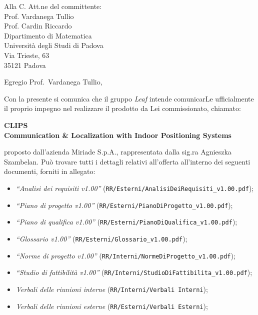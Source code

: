 \documentclass[a4paper,12pt]{letteracdp}
\author{Federico Tavella}
\date{21 gennaio 2016}
\begin{document}
	\begin{letter}{
		Alla C. Att.ne del committente: \\
		Prof. Vardanega Tullio \\
		Prof. Cardin Riccardo \\
		Dipartimento di Matematica \\
		Università degli Studi di Padova \\
		Via Trieste, 63 \\
		35121 Padova}
		
		\opening{Egregio Prof.~Vardanega Tullio,}
		Con la presente si comunica che il gruppo \textit{Leaf} intende comunicarLe ufficialmente il proprio impegno nel realizzare il prodotto da Lei commissionato, chiamato:
\begin{center}
	\textbf{CLIPS \\ Communication \& Localization with Indoor Positioning Systems}
\end{center}
proposto dall'azienda Miriade S.p.A., rappresentata dalla sig.ra Agnieszka Szambelan.
Può trovare tutti i dettagli relativi all'offerta all'interno dei seguenti documenti, forniti in allegato:

\begin{itemize}
	\item \textit{“Analisi dei requisiti v1.00”} (\texttt{RR/Esterni/AnalisiDeiRequisiti\_v1.00.pdf});

	\item \textit{“Piano di progetto v1.00”} (\texttt{RR/Esterni/PianoDiProgetto\_v1.00.pdf});

	\item \textit{“Piano di qualifica v1.00”} (\texttt{RR/Esterni/PianoDiQualifica\_v1.00.pdf});
	
	\item \textit{“Glossario v1.00”} (\texttt{RR/Esterni/Glossario\_v1.00.pdf});
	
	\item \textit{“Norme di progetto v1.00”} (\texttt{RR/Interni/NormeDiProgetto\_v1.00.pdf});

	\item \textit{“Studio di fattibilità v1.00”} (\texttt{RR/Interni/StudioDiFattibilita\_v1.00.pdf});

	\item \textit{Verbali delle riunioni interne}	(\texttt{RR/Interni/Verbali Interni});
	
	\item \textit{Verbali delle riunioni esterne}	(\texttt{RR/Esterni/Verbali Esterni});
		

\end{itemize}
\end{letter}
\end{document}
